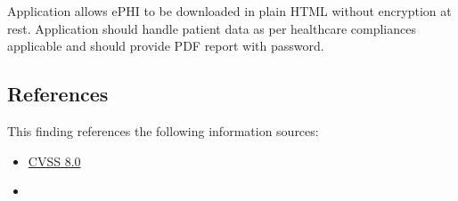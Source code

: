 Application allows ePHI to be downloaded in plain HTML without encryption at rest. Application should handle patient data as per healthcare compliances applicable and should provide PDF report with password.





\subsection*{References}

This finding references the following information sources:

\begin{itemize}
	\item \href{https://www.first.org/cvss/calculator/3.0#CVSS:3.0/AV:A/AC:L/PR:L/UI:N/S:U/C:H/I:H/A:H}
	{CVSS 8.0}
	\item {}
\end{itemize}




